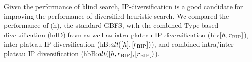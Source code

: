 Given the performance of blind search,
IP-diversification is a good candidate for improving the performance of diversified heuristic search.
% 
% 
% 
We compared the performance of 
(h), the standard GBFS, with
the combined Type-based diversification (hdD) from 
as well as intra-plateau  IP-diversification (hb:$[h,r_\text{BIP}]$), inter-plateau IP-diversification (hB:$alt([h],[r_\text{BIP}])$), and combined intra/inter-plateau IP diversification (hbB:$alt([h,r_\text{BIP}],[r_\text{BIP}])$).




